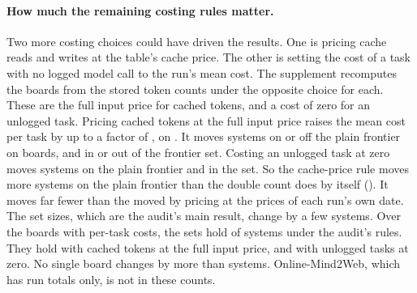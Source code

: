 \documentclass[11pt]{article}
\begin{document}
\paragraph{How much the remaining costing rules matter.}
Two more costing choices could have driven the results. One is pricing cache reads and writes at the table's cache price. The other is setting the cost of a task with no logged model call to the run's mean cost. The supplement recomputes the boards from the stored token counts under the opposite choice for each. These are the full input price for cached tokens, and a cost of zero for an unlogged task. Pricing cached tokens at the full input price raises the mean cost per task by up to a factor of \NumSensCostRatioMax{}, on \NumSensCostRatioMaxName{}. It moves \NumSensFullCacheFrontierChanged{} systems on or off the plain frontier on \NumSensFullCacheFrontierBoards{} boards, and \NumSensFullCacheSetChanged{} in or out of the frontier set. Costing an unlogged task at zero moves \NumSensNoImpFrontierChanged{} systems on the plain frontier and \NumSensNoImpSetChanged{} in the set. So the cache-price rule moves more systems on the plain frontier than the double count does by itself (\NumFlipCounting{}). It moves far fewer than the \NumFlipPricing{} moved by pricing at the prices of each run's own date. The set sizes, which are the audit's main result, change by a few systems. Over the \NumSensBoards{} boards with per-task costs, the sets hold \NumSensBaseSet{} of \NumSensSystems{} systems under the audit's rules. They hold \NumSensFullCacheSet{} with cached tokens at the full input price, and \NumSensNoImpSet{} with unlogged tasks at zero. No single board changes by more than \NumSensSetBoardMaxChange{} systems. Online-Mind2Web, which has run totals only, is not in these counts.
\end{document}
